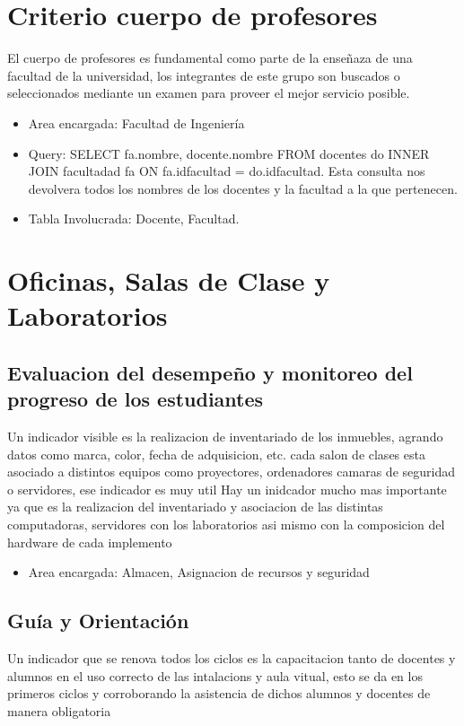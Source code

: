 \documentclass[12pt,a4paper]{report}
\begin{document}
\section{ Criterio cuerpo de profesores}
El cuerpo de profesores es fundamental como parte de la enseñaza de una facultad de la universidad, los integrantes de este grupo son buscados o seleccionados mediante un examen para proveer el mejor servicio posible.

\begin{itemize}
\item Area encargada: Facultad de Ingeniería

\item Query: SELECT fa.nombre, docente.nombre FROM docentes do INNER JOIN facultadad fa ON fa.idfacultad = do.idfacultad. Esta consulta nos devolvera todos los nombres de los docentes y la facultad a la que pertenecen.

\item Tabla Involucrada: Docente, Facultad.
\end{itemize}

\section{ Oficinas, Salas de Clase y Laboratorios}
\subsection{Evaluacion del desempeño y monitoreo del progreso de los estudiantes}
Un indicador visible es la realizacion de inventariado de los inmuebles, agrando datos como marca, color, fecha de adquisicion, etc.
cada salon de clases esta asociado a distintos equipos como proyectores, ordenadores camaras de seguridad o servidores, ese indicador es muy util
Hay un inidcador mucho mas importante ya que es la realizacion del inventariado y asociacion de las distintas computadoras, servidores con los laboratorios asi mismo con la composicion del hardware de cada implemento

\begin{itemize}
\item Area encargada: Almacen, Asignacion de recursos y seguridad

\end{itemize}
\subsection{Guía y Orientación}
Un indicador que se renova todos los ciclos es la capacitacion tanto de docentes y alumnos en el uso correcto de las intalacions y aula vitual, esto se da en los primeros ciclos y corroborando la asistencia de dichos alumnos y docentes de manera obligatoria
\end{document}
